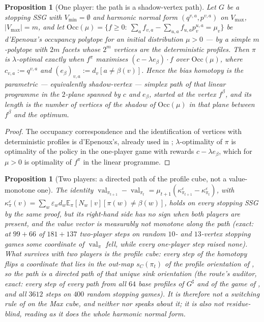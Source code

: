 \documentclass[11pt]{article}
\theoremstyle{plain}
\newtheorem{proposition}[theorem]{Proposition}
\theoremstyle{definition}
\DeclareMathOperator{\val}{val}
\newcommand{\Vmax}{V_{\max}}
\newcommand{\Vmin}{V_{\min}}
\begin{document}
\begin{proposition}[One player: the path is a shadow-vertex path]\label{prop:bias-shadow}
Let $G$ be a stopping SSG with $\Vmin=\emptyset$ and harmonic normal form
$(q^{v,a},p^{v,a})$ on $\Vmax$, $|\Vmax|=m$, and let
$\mathrm{Occ}(\mu)=\{f\ge0:\ \sum_{a}f_{v,a}-\sum_{u,a}f_{u,a}p^{u,a}_v=\mu_v\}$
be d'Epenoux's occupancy polytope for an initial distribution $\mu>0$ ---
by  a simple $m$-polytope with $2m$ facets whose
$2^{m}$ vertices are the deterministic profiles. Then $\pi$ is $\lambda$-optimal exactly when $f^{\pi}$
maximises $(c-\lambda e_\beta)\cdot f$ over $\mathrm{Occ}(\mu)$, where
$c_{v,a}:=q^{v,a}$ and $(e_\beta)_{v,a}:=d_v[a\ne\beta(v)]$. Hence the bias
homotopy is the parametric --- equivalently shadow-vertex --- simplex path of
that linear programme in the $2$-plane spanned by $c$ and $e_\beta$, started
at the vertex $f^{\beta}$, and its length is the number of vertices of the
shadow of $\mathrm{Occ}(\mu)$ in that plane between $f^{\beta}$ and the
optimum.
\end{proposition}

\begin{proof}
The occupancy correspondence and the identification of vertices with
deterministic profiles is d'Epenoux's, already used in
; $\lambda$-optimality of $\pi$ is optimality of the
policy in the one-player game with rewards $c-\lambda e_\beta$, which for
$\mu>0$ is optimality of $f^{\pi}$ in the linear programme.
\end{proof}

\begin{proposition}[Two players: a directed path of the profile cube, not a value-monotone one]\label{prop:bias-two-nonmono}
The identity $\val_{\pi_{t+1}}-\val_{\pi_t}=\mu_{t+1}
(\kappa^{\varepsilon}_{\pi_{t+1}}-\kappa^{\varepsilon}_{\pi_t})$, with
$\kappa^{\varepsilon}_\pi(v)=\sum_w\varepsilon_wd_w\mathbb E_\pi[N_w\mid v]
[\pi(w)\ne\beta(w)]$, holds on every stopping SSG by the same proof, but
its right-hand side has no sign when both players are present, and the
value vector is measurably not monotone along the path (exact: at $99+66$
of $181+137$ two-player steps on random $10$- and $13$-vertex stopping
games some coordinate of $\val_\pi$ fell, while every one-player step
raised none). What survives with two players is the profile cube: every
step of the homotopy flips a coordinate that lies in the out-map
$s_C(\pi_t)$ of the profile orientation of , so
the path is a directed path of that unique sink orientation (the route's
auditor, exact: every step of every path from all $64$ base profiles of
$G^{\sharp}$ and of the game of , and all $3612$
steps on $400$ random stopping games). It is therefore not a switching
rule of  on the Max cube, and neither
nor 
speaks about it; it is also not residue-blind, reading as it does the whole
harmonic normal form.
\end{proposition}
\end{document}
